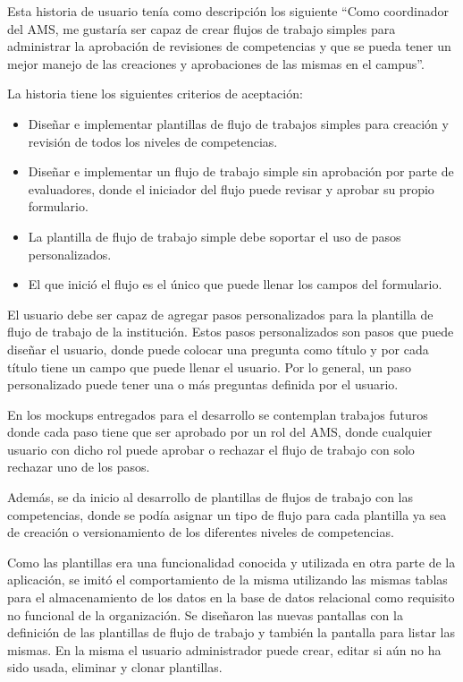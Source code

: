 Esta historia de usuario tenía como descripción los siguiente \enquote{Como coordinador del AMS, me gustaría ser capaz de crear flujos de trabajo simples para administrar la aprobación de revisiones de competencias y que se pueda tener un mejor manejo de las creaciones y aprobaciones de las mismas en el campus}.

La historia tiene los siguientes criterios de aceptación:
\begin{itemize}
	\item Diseñar e implementar plantillas de flujo de trabajos simples para creación y revisión de todos los niveles de competencias.
	\item Diseñar e implementar un flujo de trabajo simple sin aprobación por parte de evaluadores, donde el iniciador del flujo puede revisar y aprobar su propio formulario.
	\item La plantilla de flujo de trabajo simple debe soportar el uso de pasos personalizados.
	\item El que inició el flujo es el único que puede llenar los campos del formulario.
\end{itemize}

El usuario debe ser capaz de agregar pasos personalizados para la plantilla de flujo de trabajo de la institución. Estos pasos personalizados son pasos que puede diseñar el usuario, donde puede colocar una pregunta como título y por cada título tiene un campo que puede llenar el usuario. Por lo general, un paso personalizado puede tener una o más preguntas definida por el usuario.

En los mockups entregados para el desarrollo se contemplan trabajos futuros donde cada paso tiene que ser aprobado por un rol del AMS, donde cualquier usuario con dicho rol puede aprobar o rechazar el flujo de trabajo con solo rechazar uno de los pasos. 

Además, se da inicio al desarrollo de plantillas de flujos de trabajo con las competencias, donde se podía asignar un tipo de flujo para cada plantilla ya sea de creación o versionamiento de los diferentes niveles de competencias.

Como las plantillas era una funcionalidad conocida y utilizada en otra parte de la aplicación, se imitó el comportamiento de la misma utilizando las mismas tablas para el almacenamiento de los datos en la base de datos relacional como requisito no funcional de la organización. Se diseñaron las nuevas pantallas con la definición de las plantillas de flujo de trabajo y también la pantalla para listar las mismas. En la misma el usuario administrador puede crear, editar si aún no ha sido usada, eliminar y clonar plantillas.

